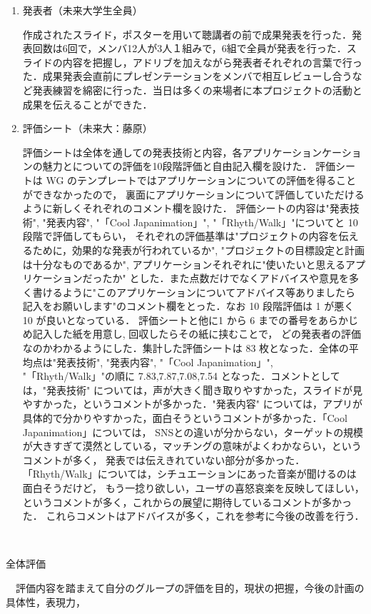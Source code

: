 \begin{enumerate}
\item 発表者（未来大学生全員）
\par
作成されたスライド，ポスターを用いて聴講者の前で成果発表を行った．発表回数は6回で，メンバ12人が3人１組みで，6組で全員が発表を行った．スライドの内容を把握し，アドリブを加えながら発表者それぞれの言葉で行った．成果発表会直前にプレゼンテーションをメンバで相互レビューし合うなど発表練習を綿密に行った．当日は多くの来場者に本プロジェクトの活動と成果を伝えることができた．
\item 評価シート（未来大：藤原）
\par
評価シートは全体を通しての発表技術と内容，各アプリケーションケーションの魅力とについての評価を10段階評価と自由記入欄を設けた．
評価シートは WG のテンプレートではアプリケーションについての評価を得ることができなかったので，
裏面にアプリケーションについて評価していただけるように新しくそれぞれのコメント欄を設けた．
評価シートの内容は"発表技術", "発表内容", "「Cool Japanimation」", "「Rhyth/Walk」"についてと 10 段階で評価してもらい，
それぞれの評価基準は"プロジェクトの内容を伝えるために，効果的な発表が行われているか", 
"プロジェクトの目標設定と計画は十分なものであるか", アプリケーションそれぞれに"使いたいと思えるアプリケーションだったか"
とした．また点数だけでなくアドバイスや意見を多く書けるように"このアプリケーションについてアドバイス等ありましたら
記入をお願いします"のコメント欄をとった．なお 10 段階評価は 1 が悪く 10 が良いとなっている．
評価シートと他に1 から 6 までの番号をあらかじめ記入した紙を用意し, 回収したらその紙に挟むことで，
どの発表者の評価なのかわかるようにした．集計した評価シートは 83 枚となった．全体の平均点は"発表技術", "発表内容", 
"「Cool Japanimation」", "「Rhyth/Walk」"の順に 7.83,7.87,7.08,7.54 となった．コメントとしては，"発表技術"
については，声が大きく聞き取りやすかった，スライドが見やすかった，というコメントが多かった．"発表内容"
については，アプリが具体的で分かりやすかった，面白そうというコメントが多かった．「Cool Japanimation」については，
SNSとの違いが分からない，ターゲットの規模が大きすぎて漠然としている，マッチングの意味がよくわかならい，というコメントが多く，
発表では伝えきれていない部分が多かった．「Rhyth/Walk」については，シチュエーションにあった音楽が聞けるのは面白そうだけど，
もう一捻り欲しい，ユーザの喜怒哀楽を反映してほしい，というコメントが多く，これからの展望に期待しているコメントが多かった．
これらコメントはアドバイスが多く，これを参考に今後の改善を行う．


\end{enumerate}　
\par
全体評価
\par　評価内容を踏まえて自分のグループの評価を目的，現状の把握，今後の計画の具体性，表現力，
